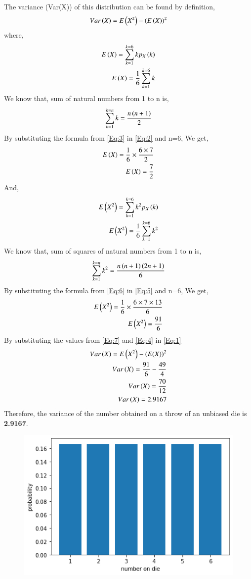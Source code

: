 \documentclass[journal,12pt,twocolumn]{IEEEtran}
\begin{document}
		              
The variance (Var(X)) of this distribution can be found by definition,\\
\begin{align}
Var\left(X\right) = E\left(X^{2}\right)-\left(E\left(X\right)\right)^{2} \label{Eq:1}
\end{align}
where,
\begin{align}
E\left(X\right)=\sum_{k=1}^{k=6} kp_X\left(k\right) \notag \\
E\left(X\right)=\frac{1}{6}\sum_{k=1}^{k=6} k \label{Eq:2}
\end{align}
We know that, sum of natural numbers from 1 to n is,
\begin{align}
\sum_{k=1}^{k=n} k = \frac{n\left(n+1\right)}{2} \label{Eq:3}
\end{align}
By substituting the formula from \eqref{Eq:3} in \eqref{Eq:2} and n=6, We get,
\begin{align}
E\left(X\right)=\frac{1}{6} \times \frac{6\times7}{2} \notag \\
E\left(X\right)=\frac{7}{2} \label{Eq:4}
\end{align}
And,
\begin{align}
E\left(X^{2}\right)=\sum_{k=1}^{k=6} k^{2}p_X\left(k\right) \notag \\
E\left(X^{2}\right)=\frac{1}{6}\sum_{k=1}^{k=6} k^{2} \label{Eq:5}
\end{align}
We know that, sum of squares of natural numbers from 1 to n is,
\begin{align}
\sum_{k=1}^{k=n} k^{2} = \frac{n\left(n+1\right)\left(2n+1\right)}{6} \label{Eq:6}
\end{align}
By substituting the formula from \eqref{Eq:6} in \eqref{Eq:5} and n=6, We get,
\begin{align}
E\left(X^{2}\right)=\frac{1}{6} \times \frac{6\times7\times13}{6} \notag \\
E\left(X^{2}\right)=\frac{91}{6} \label{Eq:7}
\end{align}
By substituting the values from \eqref{Eq:7} and \eqref{Eq:4} in \eqref{Eq:1}
\begin{align}
Var\left(X\right) = E\left(X^{2}\right)-\left(E(X)\right)^{2} \notag \\
Var\left(X\right) = \frac{91}{6} - \frac{49}{4} \notag \\
Var\left(X\right) = \frac{70}{12} \notag \\
Var\left(X\right) = 2.9167 \label{Eq:8}
\end{align}
Therefore, the variance of the number obtained on a throw of an unbiased die is \textbf{2.9167}.
\newpage
\begin{figure}
    \centering
    \includegraphics[width=18cm]{Assignment_2.png}
\end{figure}
\end{document}
